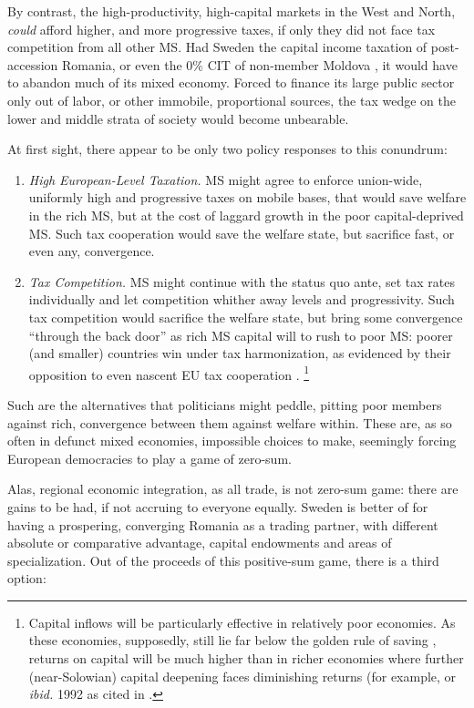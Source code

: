 By contrast, the high-productivity, high-capital markets in the West and North, \emph{could} afford higher, and more progressive taxes, if only they did not face tax competition from all other \gls{MS}.
Had Sweden the capital income taxation of post-accession Romania, or even the 0\% \gls{CIT} of non-member Moldova \citep{Piatkowski2008}, it would have to abandon much of its mixed economy.
Forced to finance its large public sector only out of labor, or other immobile, proportional sources, the tax wedge on the lower and middle strata of society would become unbearable.

At first sight, there appear to be only two policy responses to this conundrum:
\begin{enumerate}
	\item \emph{High European-Level Taxation.}
	\gls{MS} might agree to enforce union-wide, uniformly high and progressive taxes on mobile bases, that would save welfare in the rich \gls{MS}, but at the cost of laggard growth in the poor capital-deprived \gls{MS}.
	Such tax cooperation would save the welfare state, but sacrifice fast, or even any, convergence.

	\item \emph{Tax Competition.}
	\gls{MS} might continue with the status quo ante, set tax rates individually and let competition whither away levels and progressivity.
	Such tax competition would sacrifice the welfare state, but bring some convergence ``through the back door'' as rich \gls{MS} capital will to rush to poor \gls{MS}:
	poorer (and smaller) countries win under tax harmonization, as evidenced by their opposition to even nascent \gls{EU} tax cooperation \citep[138]{Kellermann2009}.
	\footnote{
		Capital inflows will be particularly effective in relatively poor economies.
		As these economies, supposedly, still lie far below the golden rule of saving \citep{Solow1956}, returns on capital will be much higher than in richer economies where further (near-Solowian) capital deepening faces diminishing returns (for example, \citealt{Barro1995} or \emph{ibid.} 1992 as cited in \cite[3]{Beckfield2009}.
	}
\end{enumerate}

Such are the alternatives that politicians might peddle, pitting poor members against rich, convergence between them against welfare within.
These are, as so often in defunct mixed economies, impossible choices to make, seemingly forcing European democracies to play a game of zero-sum.

Alas, regional economic integration, as all trade, is not zero-sum game:
there are gains to be had, if not accruing to everyone equally.
Sweden is better of for having a prospering, converging Romania as a trading partner, with different absolute or comparative advantage, capital endowments and areas of specialization.
Out of the proceeds of this positive-sum game, there is a third option:

